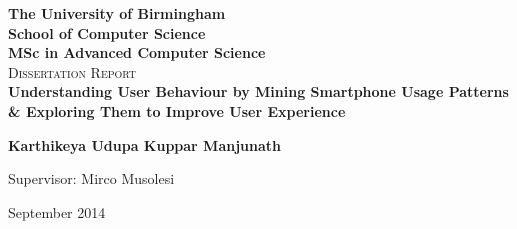 \documentclass[12pt]{report}
\begin{document}
\begin{titlepage}
\begin{center}
\lstset{language=Java}  
\textbf{\LARGE The University of Birmingham}\\[0.35cm]
\textbf{\LARGE School of Computer Science}\\[0.35cm]
\textbf{\LARGE MSc in Advanced Computer Science}\\[2.5cm]

\textsc{\Large Dissertation Report}\\[2.5cm]


{\large \bfseries Understanding User Behaviour by Mining Smartphone Usage Patterns \& Exploring Them to Improve User Experience \\[1cm] }

{ \textbf{Karthikeya Udupa Kuppar Manjunath}\\[1cm]}

{Supervisor: Mirco Musolesi}


\vfill

{\large September 2014}

\end{center}
\end{titlepage}


	
\end{document}
